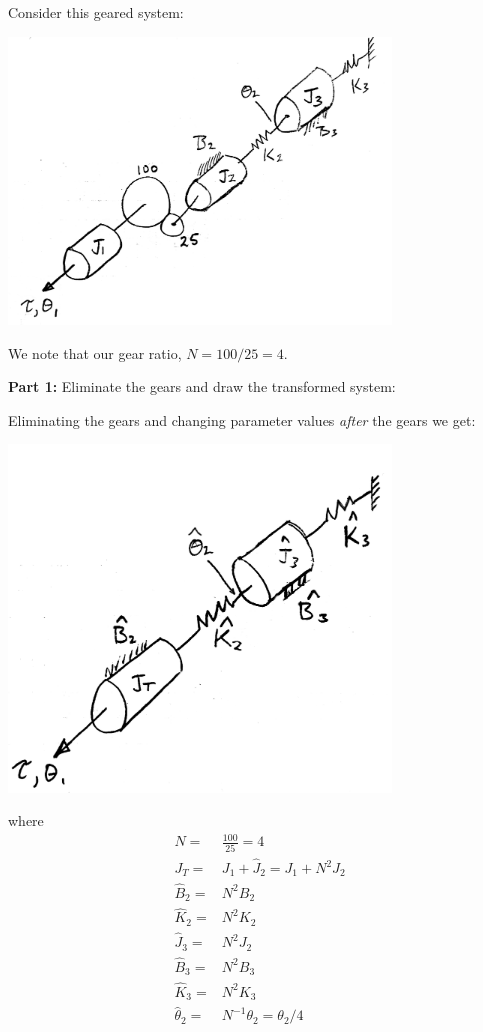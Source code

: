 \begin{Example}\label{GearTransformV1}

Consider this geared system:

\includegraphics[width=4.0in]{figs03/R21J34.png}

We note that our gear ratio, $N= 100/25 = 4$.


\noindent
{\bf Part 1:}
Eliminate the gears and draw the transformed system:

  Eliminating the gears and changing parameter values {\it after} the gears we get:

\includegraphics[width=4.0in]{figs03/R21J35.png}

where
\[
\begin{array}{rl}
N =& \frac{100}{25} = 4\\
J_T = & J_1+\hat{J}_2 = J_1+N^2J_2 \\
\hat{B}_2 =& N^2B_2\\
\hat{K}_2 =& N^2K_2\\
\hat{J}_3=&N^2J_2\\
\hat{B}_3=&N^2B_3\\
\hat{K}_3=&N^2K_3\\
\hat{\theta}_2 =& N^{-1}\theta_2 = \theta_2/4
\end{array}
\]

\end{Example}

